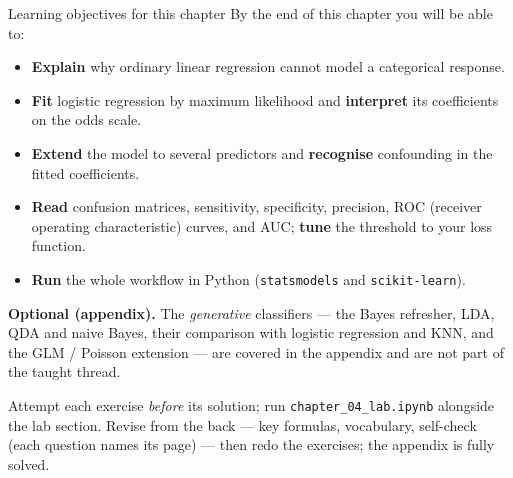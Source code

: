 \documentclass[aspectratio=169,11pt]{beamer}
\begin{document}
\begin{frame}{Learning objectives for this chapter}
  \footnotesize
  By the end of this chapter you will be able to:
  \begin{itemize}
    \item \textbf{Explain} why ordinary linear regression cannot model
          a categorical response.
    \item \textbf{Fit} logistic regression by maximum likelihood and
          \textbf{interpret} its coefficients on the odds scale.
    \item \textbf{Extend} the model to several predictors and
          \textbf{recognise} confounding in the fitted coefficients.
    \item \textbf{Read} confusion matrices, sensitivity, specificity,
          precision, ROC (receiver operating characteristic) curves, and AUC;
          \textbf{tune} the threshold to your loss function.
    \item \textbf{Run} the whole workflow in Python
          (\texttt{statsmodels} and \texttt{scikit-learn}).
  \end{itemize}
  \vspace{1mm}
  {\footnotesize \textbf{Optional (appendix).} The \emph{generative} classifiers ---
  the Bayes refresher, LDA, QDA and naive Bayes, their comparison with logistic
  regression and KNN, and the GLM / Poisson extension --- are covered in the
  appendix and are not part of the taught thread.}
  \begin{readme}
    \footnotesize Attempt each exercise \emph{before} its solution; run
    \texttt{chapter\_04\_lab.ipynb} alongside the lab section. Revise from the
    back --- key formulas, vocabulary, self-check (each question names its
    page) --- then redo the exercises; the appendix is fully solved.
  \end{readme}
\end{frame}
\end{document}
